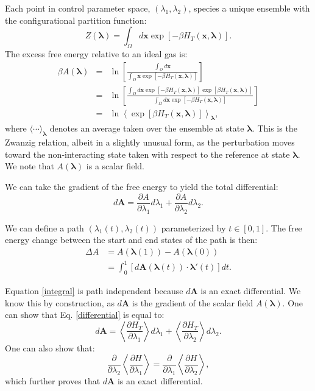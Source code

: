\documentclass[%
 preprint,
 amsmath,amssymb,
 aps,
]{revtex4-1}
\renewcommand{\vec}[1]{{\bm{#1}}}
\begin{document}
Each point in control parameter space, $(\lambda_1, \lambda_2)$, species a unique ensemble with the configurational partition function:
\begin{equation}
Z(\vec\lambda) = 
\int_\Omega d\vec x \exp \left[-\beta H_T\left(\vec x, \vec\lambda\right)\right].
\end{equation}
The excess free energy relative to an ideal gas is:
\begin{eqnarray}
\beta A(\vec\lambda) &=&
\ln \left[
\frac
	{\int_\Omega d\vec x}
	{\int_\Omega \vec x \exp\left[-\beta H_T(\vec x, \vec\lambda) \right]}
\right]\\
&=&
\ln \left[
\frac
	{\int_\Omega d\vec x \exp\left[-\beta H_T(\vec x, \vec\lambda) \right]
	 \exp\left[\beta H_T(\vec x, \vec\lambda) \right]}
	{\int_\Omega d\vec x \exp\left[-\beta H_T(\vec x, \vec\lambda) \right]}
\right]\\
&=&
\ln\left<\exp\left[\beta H_T(\vec x, \vec\lambda)\right]\right>_{\vec\lambda},
\end{eqnarray}
where $\langle \cdots \rangle_{\vec\lambda}$ denotes an average taken over the ensemble at state $\vec\lambda$.  This is the Zwanzig relation, albeit in a slightly unusual form, as the perturbation moves toward the non-interacting state taken with respect to the reference at state $\vec\lambda$. We note that $A(\vec\lambda)$ is a scalar field.

We can take the gradient of the free energy to yield the total differential:
\begin{equation}
d\vec A = \frac{\partial A}{\partial \lambda_1} d\lambda_1 + \frac{\partial A}{\partial \lambda_2} d\lambda_2. \label{differential}
\end{equation}

We can define a path $(\lambda_1(t), \lambda_2(t))$ parameterized by $t \in [0, 1]$. The free energy change between the start and end states of the path is then:
\begin{align}
\Delta A &= A\left(\vec\lambda\left(1\right)\right) -
            A\left(\vec\lambda\left(0\right)\right) \\
         &= \int_0^1 \left[d\vec A\left(\vec\lambda\left(t\right)\right)
         \cdot
         \vec\lambda'\left(t\right)\right] dt. \label{integral}
\end{align}

Equation \ref{integral} is path independent because $d\vec A$ is an exact differential. We know this by construction, as $d\vec A$ is the gradient of the scalar field $A(\vec\lambda)$. One can show that Eq. \ref{differential} is equal to:
\begin{equation}
d\vec A = \left< \frac{\partial H_T}{\partial \lambda_1} \right> d\lambda_1 +
          \left< \frac{\partial H_T}{\partial \lambda_2} \right> d\lambda_2.\label{dA}
\end{equation}
One can also show that:
\begin{equation}
\frac{\partial}{\partial \lambda_2}\left< \frac{\partial H}{\partial \lambda_1} \right>
=
\frac{\partial}{\partial \lambda_1}\left< \frac{\partial H}{\partial \lambda_2} \right>,
\end{equation}
which further proves that $d\vec A$ is an exact differential.
\end{document}
